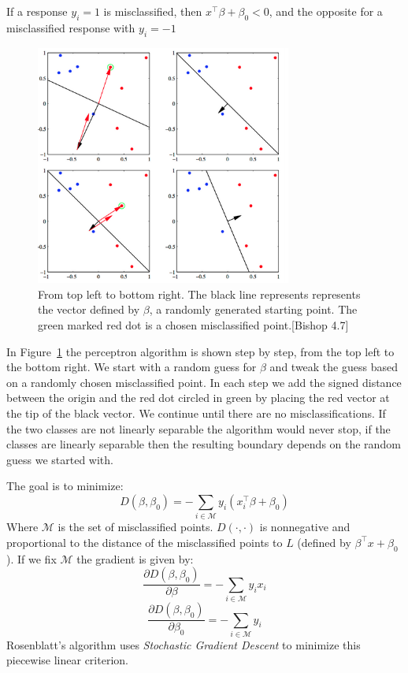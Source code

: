 \documentclass[a4paper]{article}
\begin{document}
If a response $y_i=1$ is misclassified, then $x^\top\beta+\beta_0<0$, and the opposite for a misclassified response with $y_i=-1$

\begin{figure}
\centering
\includegraphics[width=0.75\textwidth]{bishop47.png}
\caption{\label{fig:bishop}From top left to bottom right. The black line represents represents the vector defined by $\beta$, a randomly generated starting point. The green marked red dot is a chosen misclassified point.[Bishop 4.7]}
\end{figure}

In Figure~\ref{fig:bishop} the perceptron algorithm is shown step by step, from the top left to the bottom right. We start with a random guess for $\beta$ and tweak the guess based on a randomly chosen misclassified point. In each step we add the signed distance between the origin and the red dot circled in green by placing the red vector at the tip of the black vector. We continue until there are no misclassifications. If the two classes are not linearly separable the algorithm would never stop, if the classes are linearly separable then the resulting boundary depends on the random guess we started with.

The goal is to minimize:
$$D(\beta, \beta_0)=-\sum_{i\in {\mathcal M}}y_i(x_i^\top\beta+\beta_0)$$
Where $\mathcal M$ is the set of misclassified points. $D(\cdot,\cdot)$ is nonnegative and proportional to the distance of the misclassified points to $L$ (defined by $\beta^\top x+\beta_0$). If we fix $\mathcal M$ the gradient is given by:
$$\frac{\partial D(\beta,\beta_0)}{\partial\beta}=-\sum_{i\in {\mathcal M}}y_ix_i$$
$$\frac{\partial D(\beta,\beta_0)}{\partial\beta_0}=-\sum_{i\in {\mathcal M}}y_i$$
Rosenblatt's algorithm uses \textit{Stochastic Gradient Descent} to minimize this piecewise linear criterion.
\end{document}
